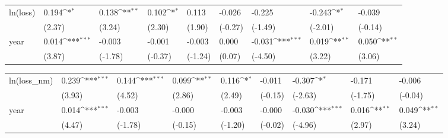 \def\sym#1{\ifmmode^{#1}\else\(^{#1}\)\fi}
\begin{tabular}{p{1.5cm} p{2cm} p{1.7cm} p{1.7cm} p{1.7cm} p{1.7cm} p{1.7cm} p{1.7cm} p{1.7cm}}
\hline
ln(loss)        &    0.194\sym{*}  &    0.138\sym{**} &    0.102\sym{*}  &    0.113         &   -0.026         &   -0.225         &   -0.243\sym{*}  &   -0.039         \\
                &   (2.37)         &   (3.24)         &   (2.30)         &   (1.90)         &  (-0.27)         &  (-1.49)         &  (-2.01)         &  (-0.14)         \\
year            &    0.014\sym{***}&   -0.003         &   -0.001         &   -0.003         &    0.000         &   -0.031\sym{***}&    0.019\sym{**} &    0.050\sym{**} \\
                &   (3.87)         &  (-1.78)         &  (-0.37)         &  (-1.24)         &   (0.07)         &  (-4.50)         &   (3.22)         &   (3.06)         \\
\end{tabular}
\def\sym#1{\ifmmode^{#1}\else\(^{#1}\)\fi}
\begin{tabular}{p{1.5cm} p{2cm} p{1.7cm} p{1.7cm} p{1.7cm} p{1.7cm} p{1.7cm} p{1.7cm} p{1.7cm}}
\hline
ln(loss\_nm)     &    0.239\sym{***}&    0.144\sym{***}&    0.099\sym{**} &    0.116\sym{*}  &   -0.011         &   -0.307\sym{*}  &   -0.171         &   -0.006         \\
                &   (3.93)         &   (4.52)         &   (2.86)         &   (2.49)         &  (-0.15)         &  (-2.63)         &  (-1.75)         &  (-0.04)         \\
year            &    0.014\sym{***}&   -0.003         &   -0.000         &   -0.003         &   -0.000         &   -0.030\sym{***}&    0.016\sym{**} &    0.049\sym{**} \\
                &   (4.47)         &  (-1.78)         &  (-0.15)         &  (-1.20)         &  (-0.02)         &  (-4.96)         &   (2.97)         &   (3.24)         \\
\end{tabular}
